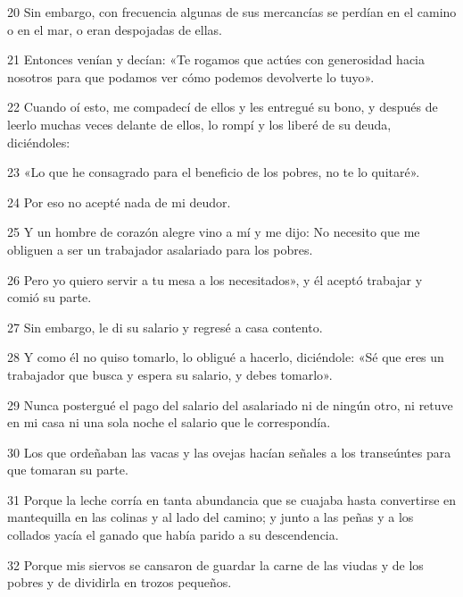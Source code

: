 \par 20 Sin embargo, con frecuencia algunas de sus mercancías se perdían en el camino o en el mar, o eran despojadas de ellas.

\par 21 Entonces venían y decían: «Te rogamos que actúes con generosidad hacia nosotros para que podamos ver cómo podemos devolverte lo tuyo».

\par 22 Cuando oí esto, me compadecí de ellos y les entregué su bono, y después de leerlo muchas veces delante de ellos, lo rompí y los liberé de su deuda, diciéndoles:

\par 23 «Lo que he consagrado para el beneficio de los pobres, no te lo quitaré».

\par 24 Por eso no acepté nada de mi deudor.

\par 25 Y un hombre de corazón alegre vino a mí y me dijo: No necesito que me obliguen a ser un trabajador asalariado para los pobres.

\par 26 Pero yo quiero servir a tu mesa a los necesitados», y él aceptó trabajar y comió su parte.

\par 27 Sin embargo, le di su salario y regresé a casa contento.

\par 28 Y como él no quiso tomarlo, lo obligué a hacerlo, diciéndole: «Sé que eres un trabajador que busca y espera su salario, y debes tomarlo».

\par 29 Nunca postergué el pago del salario del asalariado ni de ningún otro, ni retuve en mi casa ni una sola noche el salario que le correspondía.

\par 30 Los que ordeñaban las vacas y las ovejas hacían señales a los transeúntes para que tomaran su parte.

\par 31 Porque la leche corría en tanta abundancia que se cuajaba hasta convertirse en mantequilla en las colinas y al lado del camino; y junto a las peñas y a los collados yacía el ganado que había parido a su descendencia.

\par 32 Porque mis siervos se cansaron de guardar la carne de las viudas y de los pobres y de dividirla en trozos pequeños.

